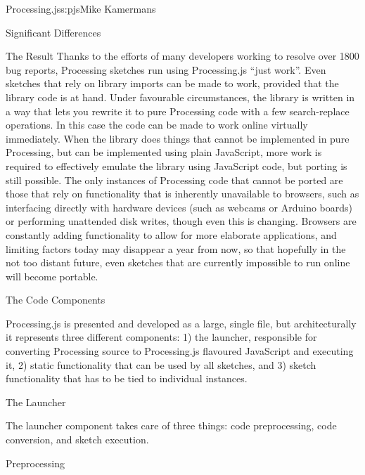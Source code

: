 \begin{aosachapter}{Processing.js}{s:pjs}{Mike Kamermans}
\begin{aosasect1}{Significant Differences}
\begin{aosasect2}{The Result}
Thanks to the efforts of many developers working to resolve over 1800
bug reports, Processing sketches run using Processing.js ``just
work''. Even sketches that rely on library imports can be made to work,
provided that the library code is at hand. Under favourable circumstances,
the library is written in a way that lets you rewrite it to pure
Processing code with a few search-replace operations. In this case the
code can be made to work online virtually immediately. When the
library does things that cannot be implemented in pure Processing, but
can be implemented using plain JavaScript, more work is required to
effectively emulate the library using JavaScript code, but porting is
still possible. The only instances of Processing code that cannot be
ported are those that rely on functionality that is inherently
unavailable to browsers, such as interfacing directly with hardware
devices (such as webcams or Arduino boards) or performing unattended
disk writes, though even this is changing. Browsers are constantly adding
functionality to allow for more elaborate applications, and limiting
factors today may disappear a year from now, so that hopefully in the not
too distant future, even sketches that are currently impossible to run
online will become portable.

\end{aosasect2}

\end{aosasect1}

\begin{aosasect1}{The Code Components}

Processing.js is presented and developed as a large, single file, but
architecturally it represents three different components: 1) the
launcher, responsible for converting Processing source to
Processing.js flavoured JavaScript and executing it, 2) static
functionality that can be used by all sketches, and 3) sketch
functionality that has to be tied to individual instances.

\begin{aosasect2}{The Launcher}

The launcher component takes care of three things: code preprocessing,
code conversion, and sketch execution.

\begin{aosasect3}{Preprocessing}


\end{aosasect3}
\end{aosasect2}
\end{aosasect1}
\end{aosachapter}
